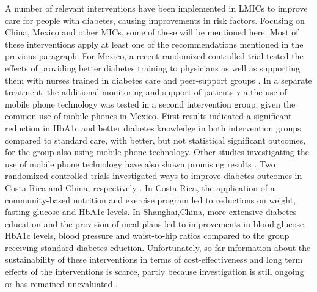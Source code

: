 A number of relevant interventions have been implemented in \acp{LMIC} to improve care for people with diabetes, causing improvements in risk factors. Focusing on China, Mexico and other \acp{MIC}, some of these will be mentioned here. Most of these interventions apply at least one of the recommendations mentioned in the previous paragraph. For Mexico, a recent randomized controlled trial tested the effects of providing better diabetes training to physicians as well as supporting them with nurses trained in diabetes care and peer-support groups \parencite{Contreras2016}. In a separate treatment, the additional monitoring and support of patients via the use of mobile phone technology was tested in a second intervention group, given the common use of mobile phones in Mexico. First results indicated a significant reduction in \ac{HbA1c} and better diabetes knowledge in both intervention groups compared to standard care, with better, but not statistical significant outcomes, for the group also using mobile phone technology. Other studies investigating the use of mobile phone technology have also shown promising results \parencite{Singh2016}. Two randomized controlled trials investigated ways to improve diabetes outcomes in Costa Rica and China, respectively \parencite{Goldhaber-Fiebert2003a,Sun2008}. In Costa Rica, the application of a community-based nutrition and exercise program led to reductions on weight, fasting glucose and \ac{HbA1c} levels. In Shanghai,China, more extensive diabetes education and the provision of meal plans led to improvements in blood glucose, \ac{HbA1c} levels, blood pressure and waist-to-hip ratios compared to the group receiving standard diabetes eduction.  Unfortunately, so far information about the sustainability of these interventions in terms of cost-effectiveness and long term effects of the interventions is scarce, partly because investigation is still ongoing \parencite{Contreras2016} or has remained unevaluated \parencite{Singh2016}.

